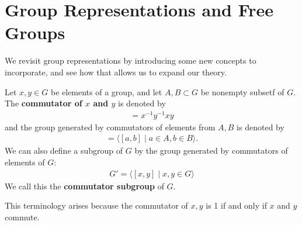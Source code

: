 \documentclass{memoir}
\begin{document}


\section{Group Representations and Free Groups}
\label{sec:group_representations_and_free_groups}
We revisit group representations by introducing some new concepts to incorporate, and see how that allows us to expand our theory.

\begin{defn}[Commutator]
	Let \(x,y \in G\) be elements of a group, and let \(A,B \subset G\) be nonempty subsetf of \(G\). The \textbf{commutator of \(x\) and \(y\)} is denoted by
	\begin{align*}
		[x,y] = x ^{-1}y^{-1}xy
	\end{align*}
	and the group generated by commutators of elements from \(A,B\) is denoted by
	\begin{align*}
		[A,B] = \langle [a,b] \mid a \in A, b \in B \rangle .
	\end{align*}
	We can also define a subgroup of \(G\) by the group generated by commutators of elements of \(G\):
	\begin{align*}
		G' = \langle [x,y] \mid x,y \in G \rangle 
	\end{align*}
	We call this the \textbf{commutator subgroup} of \(G\).
\end{defn}
This terminology arises because the commutator of \(x,y\) is 1 if and only if \(x\) and \(y \) commute.
\end{document}
